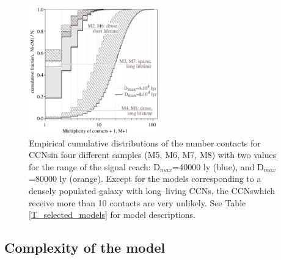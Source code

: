 \documentclass[crop]{CSLB}
\newcommand{\cetis}{CCNs}
\begin{document}
 
 
\begin{figure} \centering
   \includegraphics[width=0.5\textwidth]{F_number_of_contacts.pdf}
   \caption{
Empirical cumulative distributions of the number contacts
for \cetis in four different samples (M5, M6, M7, M8) with two
values for the range of the signal reach: D$_{max}$=40000 ly (blue),  and 
D$_{max}$=80000 ly (orange).
%
Except for the models corresponding to a densely populated galaxy with
long--living \cetis, the \cetis which receive more than 10 contacts
are very unlikely.
%
See Table \ref{T_selected_models} for model descriptions.
%
   } \label{F_number_of_contacts}
\end{figure}
        
 

\subsection{Complexity of the model}
\end{document}
